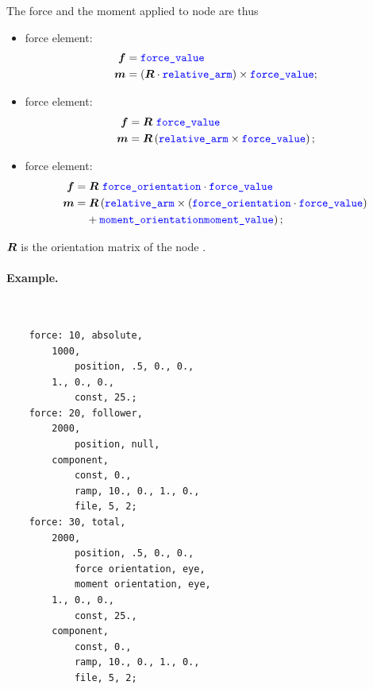 The force and the moment applied to node  are thus
\begin{itemize}
\item {} force element:
\begin{subequations}
\begin{align}
	\boldsymbol{f} & = \textcolor{blue}{\texttt{force\_value}} \\
	\boldsymbol{m} & = \left( \boldsymbol{R} \cdot \textcolor{blue}{\texttt{relative\_arm}} \right) \times \textcolor{blue}{\texttt{force\_value}} ;
\end{align}
\end{subequations}

\item {} force element:
\begin{subequations}
\begin{align}
	\boldsymbol{f} & = \boldsymbol{R} \ \textcolor{blue}{\texttt{force\_value}} \\
	\boldsymbol{m} & = \boldsymbol{R} \left( \textcolor{blue}{\texttt{relative\_arm}} \times \textcolor{blue}{\texttt{force\_value}} \right) ;
\end{align}
\end{subequations}

\item {} force element:
\begin{subequations}
\begin{align}
	\boldsymbol{f} & = \boldsymbol{R} \ \textcolor{blue}{\texttt{force\_orientation}} \cdot \textcolor{blue}{\texttt{force\_value}} \\
	\boldsymbol{m} & = \boldsymbol{R} \left( 
		\textcolor{blue}{\texttt{relative\_arm}} \times \left(  \textcolor{blue}{\texttt{force\_orientation}} \cdot \textcolor{blue}{\texttt{force\_value}} \right)
	 \right. \nonumber \\
	& \left. \hphantom{= } \mbox{} +
		\textcolor{blue}{\texttt{moment\_orientation}} \textcolor{blue}{\texttt{moment\_value}}
	 \right);
\end{align}
\end{subequations}

\end{itemize}
$\boldsymbol{R}$ is the orientation matrix of the node .

\paragraph{Example.} \
\begin{verbatim}
    force: 10, absolute,
        1000,
            position, .5, 0., 0.,
        1., 0., 0.,
            const, 25.;
    force: 20, follower,
        2000,
            position, null,
        component,
            const, 0.,
            ramp, 10., 0., 1., 0.,
            file, 5, 2;
    force: 30, total,
        2000,
            position, .5, 0., 0.,
            force orientation, eye,
            moment orientation, eye,
        1., 0., 0.,
            const, 25.,
        component,
            const, 0.,
            ramp, 10., 0., 1., 0.,
            file, 5, 2;
\end{verbatim}

